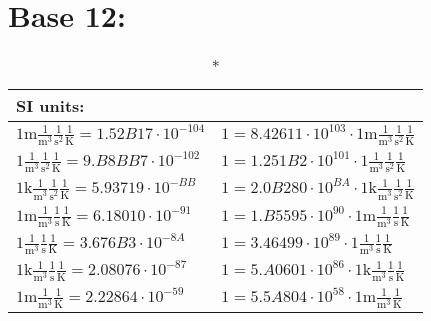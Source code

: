 \chapter{Base 12:}
\begin{center}\begin{longtable}{l l}\caption*{SI units: }\\\hline{\color{gray}$1 \bm{\mathrm{ m}}\frac1{\operatorname{m}^3}\frac1{\operatorname{s}^2}{}\frac1{\operatorname{K}} = 1.52B17\cdot10^{-104} $}   & {\color{gray}$ 1 = 8.42611\cdot10^{103} \cdot 1 \bm{\mathrm{ m}}\frac1{\operatorname{m}^3}\frac1{\operatorname{s}^2}{}\frac1{\operatorname{K}}$}  \\
{\color{black}$1 \bm{\mathrm{ }}\frac1{\operatorname{m}^3}\frac1{\operatorname{s}^2}{}\frac1{\operatorname{K}} = 9.B8BB7\cdot10^{-102} $}   & {\color{black}$ 1 = 1.251B2\cdot10^{101} \cdot 1 \bm{\mathrm{ }}\frac1{\operatorname{m}^3}\frac1{\operatorname{s}^2}{}\frac1{\operatorname{K}}$}  \\
{\color{gray}$1 \bm{\mathrm{ k}}\frac1{\operatorname{m}^3}\frac1{\operatorname{s}^2}{}\frac1{\operatorname{K}} = 5.93719\cdot10^{-BB} $}   & {\color{gray}$ 1 = 2.0B280\cdot10^{BA} \cdot 1 \bm{\mathrm{ k}}\frac1{\operatorname{m}^3}\frac1{\operatorname{s}^2}{}\frac1{\operatorname{K}}$}  \\
{\color{gray}$1 \bm{\mathrm{ m}}\frac1{\operatorname{m}^3}\frac1{\operatorname{s}}{}\frac1{\operatorname{K}} = 6.18010\cdot10^{-91} $}   & {\color{gray}$ 1 = 1.B5595\cdot10^{90} \cdot 1 \bm{\mathrm{ m}}\frac1{\operatorname{m}^3}\frac1{\operatorname{s}}{}\frac1{\operatorname{K}}$}  \\
{\color{black}$1 \bm{\mathrm{ }}\frac1{\operatorname{m}^3}\frac1{\operatorname{s}}{}\frac1{\operatorname{K}} = 3.676B3\cdot10^{-8A} $}   & {\color{black}$ 1 = 3.46499\cdot10^{89} \cdot 1 \bm{\mathrm{ }}\frac1{\operatorname{m}^3}\frac1{\operatorname{s}}{}\frac1{\operatorname{K}}$}  \\
{\color{gray}$1 \bm{\mathrm{ k}}\frac1{\operatorname{m}^3}\frac1{\operatorname{s}}{}\frac1{\operatorname{K}} = 2.08076\cdot10^{-87} $}   & {\color{gray}$ 1 = 5.A0601\cdot10^{86} \cdot 1 \bm{\mathrm{ k}}\frac1{\operatorname{m}^3}\frac1{\operatorname{s}}{}\frac1{\operatorname{K}}$}  \\
{\color{gray}$1 \bm{\mathrm{ m}}\frac1{\operatorname{m}^3}{}{}\frac1{\operatorname{K}} = 2.22864\cdot10^{-59} $}   & {\color{gray}$ 1 = 5.5A804\cdot10^{58} \cdot 1 \bm{\mathrm{ m}}\frac1{\operatorname{m}^3}{}{}\frac1{\operatorname{K}}$}  \\

\end{longtable}
\end{center}
